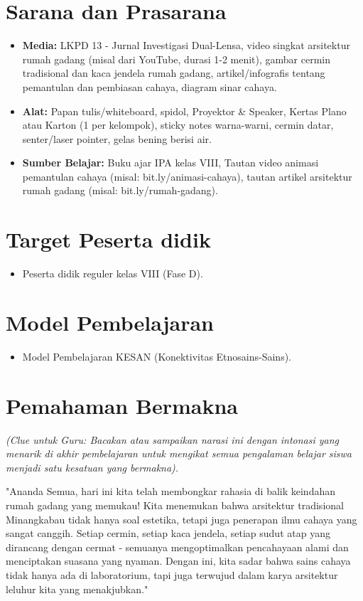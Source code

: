 \documentclass[12pt,a4paper]{article}
\begin{document}
\section{Sarana dan Prasarana}

\begin{itemize}
\item \textbf{Media:} LKPD 13 - Jurnal Investigasi Dual-Lensa, video singkat arsitektur rumah gadang (misal dari YouTube, durasi 1-2 menit), gambar cermin tradisional dan kaca jendela rumah gadang, artikel/infografis tentang pemantulan dan pembiasan cahaya, diagram sinar cahaya.
\item \textbf{Alat:} Papan tulis/whiteboard, spidol, Proyektor \& Speaker, Kertas Plano atau Karton (1 per kelompok), sticky notes warna-warni, cermin datar, senter/laser pointer, gelas bening berisi air.
\item \textbf{Sumber Belajar:} Buku ajar IPA kelas VIII, Tautan video animasi pemantulan cahaya (misal: bit.ly/animasi-cahaya), tautan artikel arsitektur rumah gadang (misal: bit.ly/rumah-gadang).
\end{itemize}

\section{Target Peserta didik}

\begin{itemize}
\item Peserta didik reguler kelas VIII (Fase D).
\end{itemize}

\section{Model Pembelajaran}

\begin{itemize}
\item Model Pembelajaran KESAN (Konektivitas Etnosains-Sains).
\end{itemize}

\section{Pemahaman Bermakna}
\textit{(Clue untuk Guru: Bacakan atau sampaikan narasi ini dengan intonasi yang menarik di akhir pembelajaran untuk mengikat semua pengalaman belajar siswa menjadi satu kesatuan yang bermakna).}

"Ananda Semua, hari ini kita telah membongkar rahasia di balik keindahan rumah gadang yang memukau! Kita menemukan bahwa arsitektur tradisional Minangkabau tidak hanya soal estetika, tetapi juga penerapan ilmu cahaya yang sangat canggih. Setiap cermin, setiap kaca jendela, setiap sudut atap yang dirancang dengan cermat - semuanya mengoptimalkan pencahayaan alami dan menciptakan suasana yang nyaman. Dengan ini, kita sadar bahwa sains cahaya tidak hanya ada di laboratorium, tapi juga terwujud dalam karya arsitektur leluhur kita yang menakjubkan."
\end{document}
